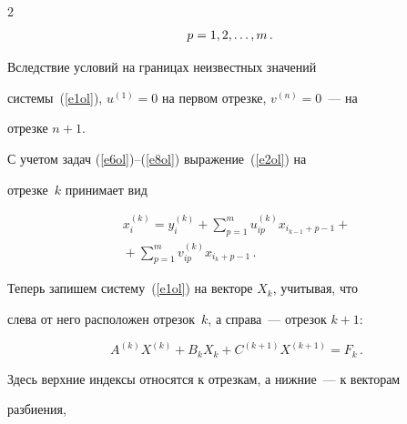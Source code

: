 \begin{multicols}{2}
\begin{align}
&p=1, 2, \ldots , m\,.\notag


     \end{align}





     Вследствие условий на границах неизвестных значений


системы~(\ref{e1ol}), $u^{(1)} = 0$ на первом отрезке, $v^{(n)} = 0$~--- на


отрезке $n + 1$.





     С учетом задач (\ref{e6ol})--(\ref{e8ol}) выражение~(\ref{e2ol}) на


отрезке~$k$ принимает вид


     \begin{multline}


     x_i^{(k)} = y_i^{(k)} +\sum\limits_{p=1}^m u_{ip}^{(k)} x_{i_{k-1}+p-1}+{}\\


{}+\sum\limits_{p=1}^m v_{ip}^{(k)}x_{i_k+p-1}\,.


     \label{e9ol}


     \end{multline}





     Теперь запишем систему~(\ref{e1ol}) на векторе $X_k$, учитывая, что


слева от него расположен отрезок~$k$, а справа~--- отрезок $k + 1$:


     \begin{equation}


     A^{(k)} X^{(k)} +B_k X_k +C^{(k+1)} X^{(k+1)} = F_k\,.


     \label{e10ol}


     \end{equation}


Здесь верхние индексы относятся к отрезкам, а нижние~--- к векторам


разбиения,


\end{multicols}


